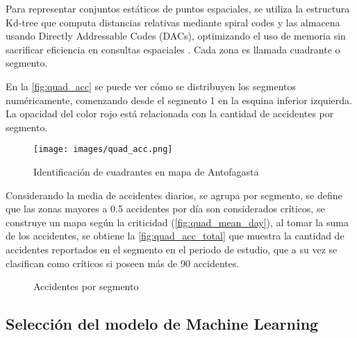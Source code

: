\documentclass[12pt]{article}
\begin{document}
Para representar conjuntos estáticos de puntos espaciales, se utiliza la estructura Kd-tree que computa distancias relativas mediante spiral codes y las almacena usando Directly Addressable Codes (DACs), optimizando el uso de memoria sin sacrificar eficiencia en consultas espaciales \parencite{gutierrez2023ckdtree}. Cada zona es llamada cuadrante o segmento.

En la \autoref{fig:quad_acc} se puede ver cómo se distribuyen los segmentos numéricamente, comenzando desde el segmento 1 en la esquina inferior izquierda. La opacidad del color rojo está relacionada con la cantidad de accidentes por segmento.

\begin{figure}[H]
    \centering
    \texttt{[image: images/quad\_acc.png]}
    \caption{Identificación de cuadrantes en mapa de Antofagasta}
    \label{fig:quad_acc}
\end{figure}

Considerando la media de accidentes diarios, se agrupa por segmento, se define que las zonas mayores a 0.5 accidentes por día son considerados críticos, se construye un mapa según la criticidad (\autoref{fig:quad_mean_day}), al tomar la suma de los accidentes, se obtiene la \autoref{fig:quad_acc_total} que muestra la cantidad de accidentes reportados en el segmento en el periodo de estudio, que a su vez se clasifican como críticos si poseen más de 90 accidentes.

\begin{figure}[H]
    \centering
    \caption{Accidentes por segmento}
\end{figure}

\subsection{Selección del modelo de Machine Learning}
\end{document}
